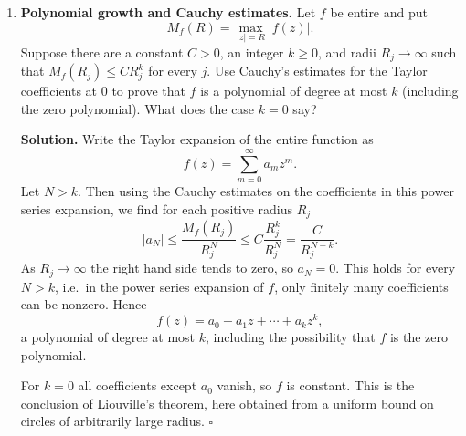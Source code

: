 \documentclass[12pt,reqno]{amsart}
\newcommand{\C}{\mathbb{C}}
\newenvironment{solution}
  {\par\smallskip\begin{tcolorbox}[breakable,enhanced,colback=solblue,colframe=solframe,
   boxrule=0.5pt,arc=2pt,left=6pt,right=6pt,top=4pt,bottom=4pt]\noindent\textbf{Solution.}}
  {\hfill$\square$\end{tcolorbox}\par\medskip}
\begin{document}
\begin{enumerate}
\begin{solution}
\medskip
\noindent (c) Suppose there were a continuous function $g$ on
$\C\setminus\{0\}$ satisfying $g(z)^n=z$. On $[0,2\pi]$ put
\[
h(t)=g(e^{it})e^{-it/n}.
\]
Then $h$ is continuous and
\[
h(t)^n=g(e^{it})^n e^{-it}=1.
\]
Thus $h$ takes its values in the finite set of $n$th roots of unity.
Since $[0,2\pi]$ is connected, $h$ must be constant, say $h(t)=c$
with $c^n=1$. It follows that
\[
g(e^{it})=ce^{it/n}.
\]
Evaluating at $t=0$ and $t=2\pi$ gives
\[
g(1)=c\qquad\text{and}\qquad g(1)=ce^{2\pi i/n}.
\]
Since $c\neq0$ and $e^{2\pi i/n}\neq1$ for $n\geq2$, this is a
contradiction. Hence no such continuous function exists on the entire
punctured plane.
\end{solution}

\item \textbf{Polynomial growth and Cauchy estimates.}
Let $f$ be entire and put
\[
 M_f(R)=\max_{|z|=R}|f(z)|.
\]
Suppose there are a constant $C>0$, an integer $k\geq0$, and radii
$R_j\to\infty$ such that $M_f(R_j)\leq C R_j^k$ for every $j$.
Use Cauchy's estimates for the Taylor coefficients at $0$ to prove
that $f$ is a polynomial of degree at most $k$ (including the zero
polynomial). What does the case $k=0$ say?

\begin{solution}
Write the Taylor expansion of the entire function as
\[
f(z)=\sum_{m=0}^\infty a_mz^m.
\]
Let $N>k$. Then using the Cauchy estimates on the coefficients in
this power series expansion, we find for each positive radius $R_j$
\[
|a_N|\leq\frac{M_f(R_j)}{R_j^N}
       \leq C\frac{R_j^k}{R_j^N}=\frac{C}{R_j^{N-k}}.
\]
As $R_j\to\infty$ the right hand side tends to zero, so $a_N=0$.
This holds for every $N>k$, i.e.\ in the power series expansion of
$f$, only finitely many coefficients can be nonzero. Hence
\[
f(z)=a_0+a_1z+\cdots+a_kz^k,
\]
a polynomial of degree at most $k$, including the possibility that
$f$ is the zero polynomial.

For $k=0$ all coefficients except $a_0$ vanish, so $f$ is constant.
This is the conclusion of Liouville's theorem, here obtained from a
uniform bound on circles of arbitrarily large radius.
\end{solution}

\end{enumerate}
\end{document}
